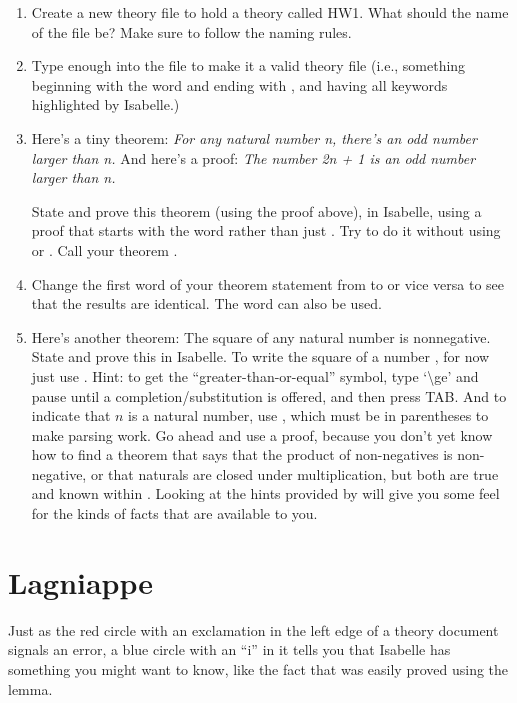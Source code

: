 \begin{enumerate}
    \item Create a new theory file to hold a theory called HW1. What should the name of the file be? Make sure to follow the naming rules.
    \item Type enough into the file to make it a valid theory file (i.e., something beginning with the word  and ending with , and having all keywords highlighted by Isabelle.)
    \item Here's a tiny theorem: \textit{For any natural number n, there's an odd number larger than n. }And here's a proof:\textit{ The number 2n + 1 is an odd number larger than n. }

State and prove this theorem (using the proof above), in Isabelle, using a proof that starts with the word  rather than just . Try to do it without using  or . Call your theorem . 

\item Change the first word of your theorem statement from  to  or vice versa to see that the results are identical. The word  can also be used. 
 
\item Here's another theorem: The square of any natural number is nonnegative. State and prove this in Isabelle. To write the square of a number , for now just use . Hint: to get the ``greater-than-or-equal'' symbol, type `\textbackslash{}ge' and pause until a completion/substitution is offered, and then press TAB. And to indicate that $n$ is a natural number, use , which must be in parentheses to make parsing work. Go ahead and use a  proof, because you don't yet know how to find a theorem that says that the product of non-negatives is non-negative, or that naturals are closed under multiplication, but both are true and known within . Looking at the hints provided by  will give you some feel for the kinds of facts that are available to you. 
\end{enumerate}

\section{Lagniappe}

Just as the red circle with an exclamation in the left edge of a theory document signals an error, a blue circle with an ``i'' in it tells you that Isabelle has something you might want to know, like the fact that  was easily proved using the  lemma. 

 
